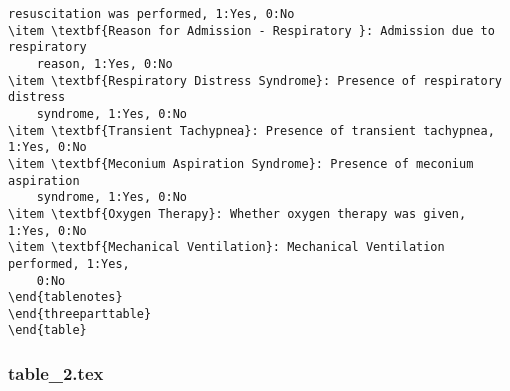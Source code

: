 \documentclass[11pt]{article}
\begin{document}
\begin{Verbatim}[tabsize=4]
	resuscitation was performed, 1:Yes, 0:No
\item \textbf{Reason for Admission - Respiratory }: Admission due to respiratory
	reason, 1:Yes, 0:No
\item \textbf{Respiratory Distress Syndrome}: Presence of respiratory distress
	syndrome, 1:Yes, 0:No
\item \textbf{Transient Tachypnea}: Presence of transient tachypnea, 1:Yes, 0:No
\item \textbf{Meconium Aspiration Syndrome}: Presence of meconium aspiration
	syndrome, 1:Yes, 0:No
\item \textbf{Oxygen Therapy}: Whether oxygen therapy was given, 1:Yes, 0:No
\item \textbf{Mechanical Ventilation}: Mechanical Ventilation performed, 1:Yes,
	0:No
\end{tablenotes}
\end{threeparttable}
\end{table}

\end{Verbatim}

\subsubsection*{table\_2.tex}
\end{document}

